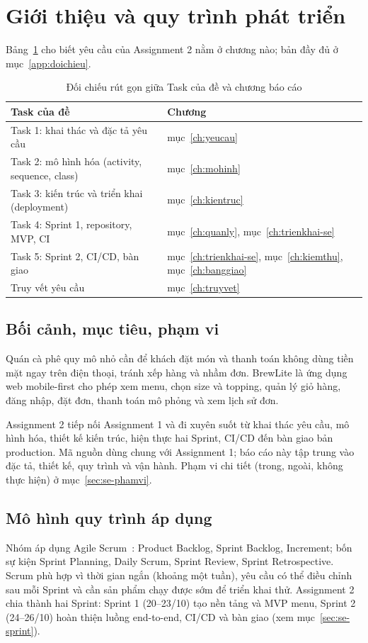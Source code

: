 \documentclass[a4paper]{article}
\begin{document}
\section{Giới thiệu và quy trình phát triển}\label{ch:gioithieu}
Bảng~\ref{tab:doichieu-rutgon} cho biết yêu cầu của Assignment 2 nằm ở chương nào; bản đầy đủ ở mục~\ref{app:doichieu}.
\begin{table}[htbp]\centering
\caption{Đối chiếu rút gọn giữa Task của đề và chương báo cáo}\label{tab:doichieu-rutgon}
\begin{tabular}{@{}p{6.4cm}p{6.6cm}@{}}\toprule
\textbf{Task của đề} & \textbf{Chương} \\ \midrule
Task 1: khai thác và đặc tả yêu cầu & mục~\ref{ch:yeucau} \\
Task 2: mô hình hóa (activity, sequence, class) & mục~\ref{ch:mohinh} \\
Task 3: kiến trúc và triển khai (deployment) & mục~\ref{ch:kientruc} \\
Task 4: Sprint 1, repository, MVP, CI & mục~\ref{ch:quanly}, mục~\ref{ch:trienkhai-se} \\
Task 5: Sprint 2, CI/CD, bàn giao & mục~\ref{ch:trienkhai-se}, mục~\ref{ch:kiemthu}, mục~\ref{ch:banggiao} \\
Truy vết yêu cầu & mục~\ref{ch:truyvet} \\ \bottomrule
\end{tabular}
\end{table}

\subsection{Bối cảnh, mục tiêu, phạm vi}\label{sec:se-boicanh}
Quán cà phê quy mô nhỏ cần để khách đặt món và thanh toán không dùng tiền mặt ngay trên điện thoại, tránh xếp hàng và nhầm đơn. BrewLite là ứng dụng web mobile-first cho phép xem menu, chọn size và topping, quản lý giỏ hàng, đăng nhập, đặt đơn, thanh toán mô phỏng và xem lịch sử đơn.

Assignment 2 tiếp nối Assignment 1 và đi xuyên suốt từ khai thác yêu cầu, mô hình hóa, thiết kế kiến trúc, hiện thực hai Sprint, CI/CD đến bàn giao bản production. Mã nguồn dùng chung với Assignment 1; báo cáo này tập trung vào đặc tả, thiết kế, quy trình và vận hành. Phạm vi chi tiết (trong, ngoài, không thực hiện) ở mục~\ref{sec:se-phamvi}.

\subsection{Mô hình quy trình áp dụng}\label{sec:se-quytrinh}
Nhóm áp dụng Agile Scrum~\cite{scrum}: Product Backlog, Sprint Backlog, Increment; bốn sự kiện Sprint Planning, Daily Scrum, Sprint Review, Sprint Retrospective. Scrum phù hợp vì thời gian ngắn (khoảng một tuần), yêu cầu có thể điều chỉnh sau mỗi Sprint và cần sản phẩm chạy được sớm để triển khai thử. Assignment 2 chia thành hai Sprint: Sprint 1 (20--23/10) tạo nền tảng và MVP menu, Sprint 2 (24--26/10) hoàn thiện luồng end-to-end, CI/CD và bàn giao (xem mục~\ref{sec:se-sprint}).
\end{document}

